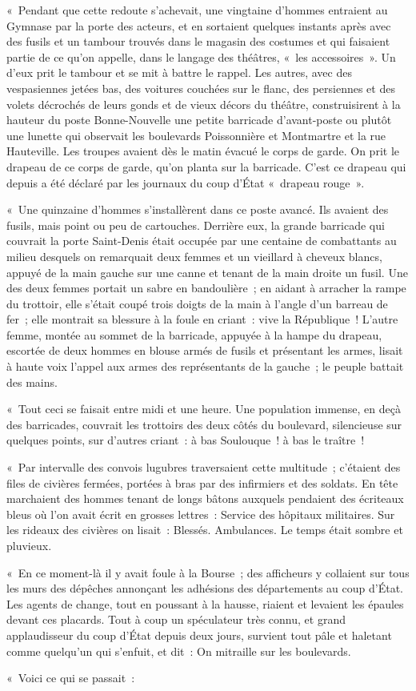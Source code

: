 \documentclass[french,twoside]{book} %
\begin{document}
« Pendant que cette redoute s’achevait, une vingtaine d’hommes entraient au Gymnase par la porte des acteurs, et en sortaient quelques instants après avec des fusils et un tambour trouvés dans le magasin des costumes et qui faisaient partie de ce qu’on appelle, dans le langage des théâtres, « les accessoires ». Un d’eux prit le tambour et se mit à battre le rappel. Les autres, avec des vespasiennes jetées bas, des voitures couchées sur le flanc, des persiennes et des volets décrochés de leurs gonds et de vieux décors du théâtre, construisirent à la hauteur du poste Bonne-Nouvelle une petite barricade d’avant-poste ou plutôt une lunette qui observait les boulevards Poissonnière et Montmartre et la rue Hauteville. Les troupes avaient dès le matin évacué le corps de garde. On prit le drapeau de ce corps de garde, qu’on planta sur la barricade. C’est ce drapeau qui depuis a été déclaré par les journaux du coup d’État « drapeau rouge ».\par
« Une quinzaine d’hommes s’installèrent dans ce poste avancé. Ils avaient des fusils, mais point ou peu de cartouches. Derrière eux, la grande barricade qui couvrait la porte Saint-Denis était occupée par une centaine de combattants au milieu desquels on remarquait deux femmes et un vieillard à cheveux blancs, appuyé de la main gauche sur une canne et tenant de la main droite un fusil. Une des deux femmes portait un sabre en bandoulière ; en aidant à arracher la rampe du trottoir, elle s’était coupé trois doigts de la main à l’angle d’un barreau de fer ; elle montrait sa blessure à la foule en criant : vive la République ! L’autre femme, montée au sommet de la barricade, appuyée à la hampe du drapeau, escortée de deux hommes en blouse armés de fusils et présentant les armes, lisait à haute voix l’appel aux armes des représentants de la gauche ; le peuple battait des mains.\par
« Tout ceci se faisait entre midi et une heure. Une population immense, en deçà des barricades, couvrait les trottoirs des deux côtés du boulevard, silencieuse sur quelques points, sur d’autres criant : à bas Soulouque ! à bas le traître !\par
« Par intervalle des convois lugubres traversaient cette multitude ; c’étaient des files de civières fermées, portées à bras par des infirmiers et des soldats. En tête marchaient des hommes tenant de longs bâtons auxquels pendaient des écriteaux bleus où l’on avait écrit en grosses lettres : Service des hôpitaux militaires. Sur les rideaux des civières on lisait : Blessés. Ambulances. Le temps était sombre et pluvieux.\par
« En ce moment-là il y avait foule à la Bourse ; des afficheurs y collaient sur tous les murs des dépêches annonçant les adhésions des départements au coup d’État. Les agents de change, tout en poussant à la hausse, riaient et levaient les épaules devant ces placards. Tout à coup un spéculateur très connu, et grand applaudisseur du coup d’État depuis deux jours, survient tout pâle et haletant comme quelqu’un qui s’enfuit, et dit : On mitraille sur les boulevards.\par
« Voici ce qui se passait :
\end{document}
